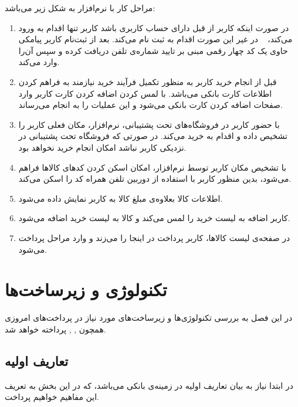 \documentclass[oneside]{report}
\begin{document}
مراحل کار با نرم‌افزار به شکل زیر می‌باشد:
\begin{enumerate}
	\item در صورت اینکه کاربر از قبل دارای حساب کاربری باشد کاربر تنها اقدام به ورود می‌کند،
	در غیر این صورت اقدام به ثبت نام می‌کند. بعد از ثبت‌نام کاربر پیامکی حاوی یک کد چهار رقمی مبنی   بر تایید شماره‌ی تلفن دریافت کرده و سپس آن‌را وارد می‌کند.
	\item قبل از انجام خرید کاربر به منظور تکمیل فرآیند خرید نیازمند به فراهم کردن اطلاعات کارت بانکی می‌باشد. با لمس کردن اضافه کردن کارت کاربر وارد صفحات اضافه کردن کارت بانکی می‌شود و این عملیات را به انجام می‌رساند.
	\item با حضور کاربر در فروشگاه‌های تحت پشتیبانی،  نرم‌افزار،   مکان فعلی کاربر را تشخیص داده و اقدام به خرید می‌کند. در صورتی که فروشگاه تحت پشتیبانی در نزدیکی کاربر نباشد امکان انجام خرید نخواهد بود.
	\item با تشخیص مکان کاربر توسط نرم‌افزار، امکان اسکن کردن کد‌های کالاها فراهم می‌شود،   بدین منظور کاربر با استفاده از دوربین تلفن همراه کد
	   		     		 {\normalsize{}}
	  			 				 را اسکن می‌کند.
	\item اطلاعات کالا بعلاوه‌ی مبلغ کالا به کاربر نمایش داده می‌شود.
	\item کاربر اضافه به لیست خرید را لمس می‌کند و کالا به لیست خرید اضافه می‌شود.
	\item در صفحه‌ی لیست کالاها، کاربر پرداخت در اینجا را می‌زند و وارد مراحل پرداخت می‌شود.
\end{enumerate}
		   
		
		\chapter{تکنولوژی {\Large{}} و زیرساخت‌ها }\label{tokenisation}
	در این فصل به بررسی تکنولوژی‌ها و زیرساخت‌های  مورد نیاز در پرداخت‌های امروزی همچون 
	   		 {\normalsize{}} , 
	    		 {\normalsize{}} , 
	    		    		 {\normalsize{}} 
	پرداخته خواهد شد.
	
	\noindent

		
	\section{تعاریف اولیه}\label{definitions}
			در ابتدا نیاز به بیان تعاریف اولیه‌ در زمینه‌ی بانکی می‌باشد، که در این بخش به تعریف این مفاهیم خواهیم پرداخت. 
\end{document}

